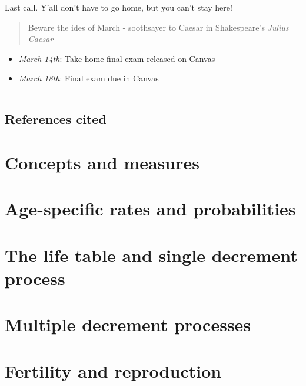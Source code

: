\documentclass[
]{book}
\providecommand{\tightlist}{%
  \setlength{\itemsep}{0pt}\setlength{\parskip}{0pt}}
\begin{document}
Last call. Y'all don't have to go home, but you can't stay here!

\begin{quote}
Beware the ides of March
- soothsayer to Caesar in Shakespeare's \emph{Julius Caesar}
\end{quote}

\begin{itemize}
\tightlist
\item
  \emph{March 14th}: Take-home final exam released on Canvas
\item
  \emph{March 18th}: Final exam due in Canvas
\end{itemize}

\begin{center}\rule{0.5\linewidth}{0.5pt}\end{center}

\hypertarget{references-cited}{%
\section*{References cited}\label{references-cited}}

\hypertarget{concepts-and-measures}{%
\chapter{Concepts and measures}\label{concepts-and-measures}}

\hypertarget{age-specific-rates-and-probabilities}{%
\chapter{Age-specific rates and probabilities}\label{age-specific-rates-and-probabilities}}

\hypertarget{the-life-table-and-single-decrement-process}{%
\chapter{The life table and single decrement process}\label{the-life-table-and-single-decrement-process}}

\hypertarget{multiple-decrement-processes}{%
\chapter{Multiple decrement processes}\label{multiple-decrement-processes}}

\hypertarget{fertility-and-reproduction}{%
\chapter{Fertility and reproduction}\label{fertility-and-reproduction}}
\end{document}
